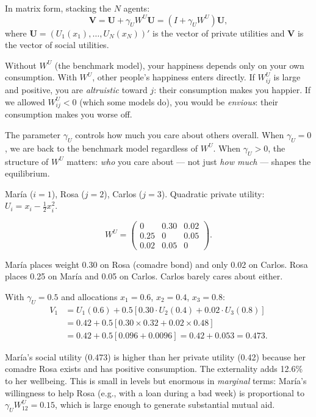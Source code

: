\documentclass[../structural_economics_book.tex]{subfiles}
\begin{document}
In matrix form, stacking the $N$ agents:
\begin{equation}\label{ch05:eq:V_matrix}
\mathbf{V} = \mathbf{U} + \gamma_U W^U \mathbf{U} = (I + \gamma_U W^U)\mathbf{U},
\end{equation}
where $\mathbf{U} = (U_1(x_1), \ldots, U_N(x_N))'$ is the vector of private utilities and $\mathbf{V}$ is the vector of social utilities.

\begin{intuition}
Without $W^U$ (the benchmark model), your happiness depends only on your own consumption. With $W^U$, other people's happiness enters directly. If $W^U_{ij}$ is large and positive, you are \textit{altruistic} toward $j$: their consumption makes you happier. If we allowed $W^U_{ij} < 0$ (which some models do), you would be \textit{envious}: their consumption makes you worse off.

The parameter $\gamma_U$ controls how much you care about others overall. When $\gamma_U = 0$, we are back to the benchmark model regardless of $W^U$. When $\gamma_U > 0$, the structure of $W^U$ matters: \textit{who} you care about --- not just \textit{how much} --- shapes the equilibrium.
\end{intuition}

\begin{example}\label{ch05:ex:vendors}
Mar\'{i}a ($i = 1$), Rosa ($j = 2$), Carlos ($j = 3$). Quadratic private utility: $U_i = x_i - \frac{1}{2}x_i^2$.

\begin{equation}
W^U = \begin{pmatrix} 0 & 0.30 & 0.02 \\ 0.25 & 0 & 0.05 \\ 0.02 & 0.05 & 0 \end{pmatrix}.
\end{equation}

Mar\'{i}a places weight 0.30 on Rosa (comadre bond) and only 0.02 on Carlos. Rosa places 0.25 on Mar\'{i}a and 0.05 on Carlos. Carlos barely cares about either.

With $\gamma_U = 0.5$ and allocations $x_1 = 0.6$, $x_2 = 0.4$, $x_3 = 0.8$:
\begin{align}
V_1 &= U_1(0.6) + 0.5[0.30 \cdot U_2(0.4) + 0.02 \cdot U_3(0.8)] \\
    &= 0.42 + 0.5[0.30 \times 0.32 + 0.02 \times 0.48] \\
    &= 0.42 + 0.5[0.096 + 0.0096] = 0.42 + 0.053 = 0.473.
\end{align}

Mar\'{i}a's social utility (0.473) is higher than her private utility (0.42) because her comadre Rosa exists and has positive consumption. The externality adds 12.6\% to her wellbeing. This is small in levels but enormous in \textit{marginal} terms: Mar\'{i}a's willingness to help Rosa (e.g., with a loan during a bad week) is proportional to $\gamma_U W^U_{12} = 0.15$, which is large enough to generate substantial mutual aid.
\end{example}
\end{document}
